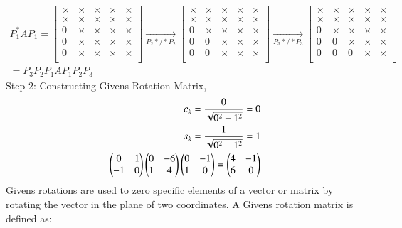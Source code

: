 \documentclass[journal]{IEEEtran}
\begin{document}
\begin{multline}
    P_1^*AP_1 = \begin{bmatrix}
        \times & \times & \times& \times& \times\\
        \times & \times & \times& \times& \times\\
        0 & \times & \times& \times& \times\\
        0 & \times & \times& \times& \times\\
        0 & \times & \times& \times& \times\\
    \end{bmatrix} \xrightarrow[P_2*/*P_2]{} \begin{bmatrix}
        \times & \times & \times& \times& \times\\
        \times & \times & \times& \times& \times\\
        0 & \times & \times& \times& \times\\
        0 & 0 & \times& \times& \times\\
        0 & 0 & \times& \times& \times\\
    \end{bmatrix} 
    \xrightarrow[P_3*/*P_3]{} \begin{bmatrix}
        \times & \times & \times& \times& \times\\
        \times & \times & \times& \times& \times\\
        0 & \times & \times& \times& \times\\
        0 & 0 & \times& \times& \times\\
        0 & 0 & 0& \times& \times\\
    \end{bmatrix}\\ = P_3P_2P_1AP_1P_2P_3
\end{multline}
Step 2:
Constructing Givens Rotation Matrix, 
\begin{align}
  c_k = \frac{0}{\sqrt{0^2 + 1^2}} = 0\\
  s_k = \frac{1}{\sqrt{0^2 + 1^2}} = 1\\
  \begin{pmatrix}
    0 & 1\\
    -1 & 0
  \end{pmatrix} \begin{pmatrix}0 & -6 \\ 1 & 4\end{pmatrix}\begin{pmatrix}0 & -1 \\ 1 & 0\end{pmatrix} = \begin{pmatrix}4 & -1 \\ 6 & 0\end{pmatrix}
\end{align}
Givens rotations are used to zero specific elements of a vector or matrix by rotating the vector in the plane of two coordinates. A Givens rotation matrix is defined as:
\end{document}
